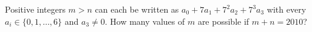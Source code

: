 Positive integers $m>n$ can each be written as $a_0+7a_1+7^2a_2+7^3a_3$ with every $a_i\in\{0,1,\dots,6\}$ and $a_3\ne0$. How many values of $m$ are possible if $m+n=2010$?
